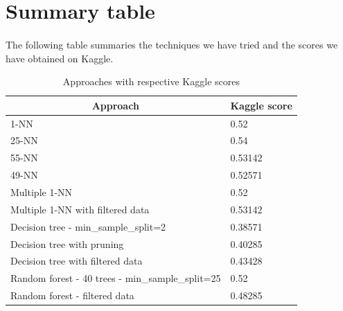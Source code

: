 \documentclass[a4paper, 11pt, oneside]{article}
\begin{document}

\section{Summary table}
\paragraph{}The following table summaries the techniques we have tried and the scores we have obtained on Kaggle.
\begin{table}[H]
\centering
\begin{tabular}{|l|l|}
\hline
\multicolumn{1}{|c|}{\textbf{Approach}}          & \multicolumn{1}{c|}{\textbf{Kaggle score}} \\ \hline
1-NN                                             & 0.52                                       \\ \hline
25-NN                                            & 0.54                                       \\ \hline
55-NN                                            & 0.53142                                    \\ \hline
49-NN                                            & 0.52571                                    \\ \hline
Multiple 1-NN                                    & 0.52                                       \\ \hline
Multiple 1-NN with filtered data                 & 0.53142                                    \\ \hline
Decision tree - min\_sample\_split=2                        & 0.38571                                    \\ \hline
Decision tree with pruning                                  & 0.40285                                    \\ \hline
Decision tree with filtered data                            & 0.43428                                    \\ \hline
Random forest - 40 trees - min\_sample\_split=25 & 0.52                                       \\ \hline
Random forest - filtered data                    & 0.48285                                    \\ \hline
\end{tabular}
\caption{Approaches with respective Kaggle scores}
\end{table}

\end{document}
